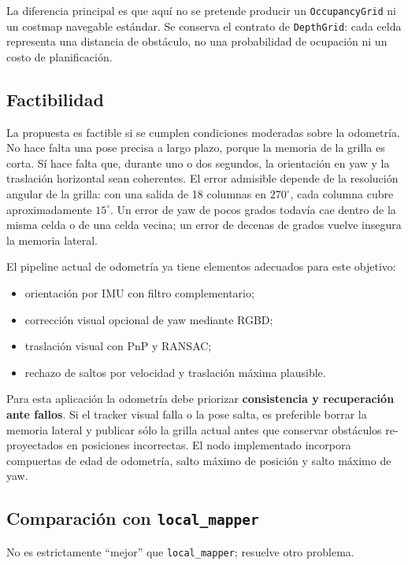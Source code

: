 La diferencia principal es que aquí no se pretende producir un \texttt{OccupancyGrid} ni
un costmap navegable estándar. Se conserva el contrato de \texttt{DepthGrid}: cada celda
representa una distancia de obstáculo, no una probabilidad de ocupación ni un costo de
planificación.

\subsection{Factibilidad}

La propuesta es factible si se cumplen condiciones moderadas sobre la odometría. No hace
falta una pose precisa a largo plazo, porque la memoria de la grilla es corta. Sí hace falta
que, durante uno o dos segundos, la orientación en yaw y la traslación horizontal sean
coherentes. El error admisible depende de la resolución angular de la grilla: con una salida
de 18 columnas en \(270^\circ\), cada columna cubre aproximadamente \(15^\circ\). Un error
de yaw de pocos grados todavía cae dentro de la misma celda o de una celda vecina; un error
de decenas de grados vuelve insegura la memoria lateral.

El pipeline actual de odometría ya tiene elementos adecuados para este objetivo:

\begin{itemize}
  \item orientación por IMU con filtro complementario;
  \item corrección visual opcional de yaw mediante RGBD;
  \item traslación visual con PnP y RANSAC;
  \item rechazo de saltos por velocidad y traslación máxima plausible.
\end{itemize}

Para esta aplicación la odometría debe priorizar \textbf{consistencia y recuperación ante
fallos}. Si el tracker visual falla o la pose salta, es preferible borrar la memoria lateral
y publicar sólo la grilla actual antes que conservar obstáculos re-proyectados en posiciones
incorrectas. El nodo implementado incorpora compuertas de edad de odometría, salto máximo de
posición y salto máximo de yaw.

\subsection{Comparación con \texttt{local\_mapper}}

No es estrictamente ``mejor'' que \texttt{local\_mapper}; resuelve otro problema.

